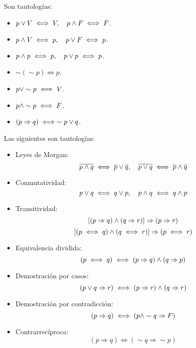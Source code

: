 \begin{proposicion}
	Son tautologías: 
	\begin{itemize}
		\item $p \vee V \iff V , \quad p \wedge F \iff F$. 
		\item $p \wedge  V \iff p, \quad p \vee F \iff p$. 
		\item $p \wedge p \iff p, \quad p \vee p \iff p$. 
		\item $\sim (\sim p) \iff p$. 
		\item $p \vee \sim p \iff V$. 
		\item $p \wedge \sim p \iff F$. 
		\item $(p \Rightarrow q) \iff \sim p \vee q$. 
	\end{itemize}
\end{proposicion}

\begin{proposicion}
	Las siguientes son tautologías: 
	\begin{itemize}
		\item Leyes de Morgan: $$\overline{p\wedge q} \iff \overline{p}\vee \overline{q}, \quad \overline{p\vee q} \iff \overline{p}\wedge \overline{q}$$
		\item Conmutatividad: $$p \vee q \iff q \vee p , \quad p \wedge q \iff q \wedge p$$
		\item Transitividad: $$[(p \Rightarrow q) \wedge (q \Rightarrow r
		)] \Rightarrow (p \Rightarrow r )$$
		$$[(p \iff q) \wedge (q \iff r)] \Rightarrow (p \iff r )$$
		\item Equivalencia dividida: $$ ( p \iff q) \iff ( p \Rightarrow q ) \wedge ( q \Rightarrow p)$$ 
		\item Demostración por casos: 
		$$ (p \vee q \Rightarrow r) \iff ( p \Rightarrow r) \wedge ( q \Rightarrow r) $$ 
		\item Demostración por contradicción: 
		$$ (p \Rightarrow q ) \iff ( p \wedge \sim q \Rightarrow F ) $$
		\item Contrarrecíproca: 
		$$ (p \Rightarrow q) \iff ( \sim q \Rightarrow \sim p ) $$ 
	\end{itemize}
\end{proposicion}

